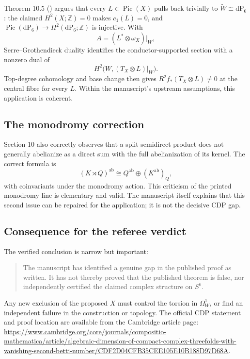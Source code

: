 \documentclass[11pt]{article}
\newcommand{\fileline}[1]{\path{#1}}
\newcommand{\Z}{\mathbb Z}
\newcommand{\Pic}{\operatorname{Pic}}
\begin{document}
Theorem 10.5 (\fileline{parts/packet_08_body.tex:459}) argues that every $L\in\Pic(X)$ pulls back trivially to $\widetilde W\cong\mathrm{dP}_6$: the claimed $H^2(X;\Z)=0$ makes $c_1(L)=0$, and $\Pic(\mathrm{dP}_6)\to H^2(\mathrm{dP}_6;\Z)$ is injective. With
\[
A=(L^*\otimes\omega_X)|_W,
\]
Serre--Grothendieck duality identifies the conductor-supported section with a nonzero dual of
\[
H^2\bigl(W,(T_X\otimes L)|_W\bigr).
\]
Top-degree cohomology and base change then gives $R^2f_*(T_X\otimes L)\neq0$ at the central fibre for every $L$. Within the manuscript's upstream assumptions, this application is coherent.

\subsection{The monodromy correction}

Section 10 also correctly observes that a split semidirect product does not generally abelianize as a direct sum with the full abelianization of its kernel. The correct formula is
\[
(K\rtimes Q)^{\mathrm{ab}}\cong Q^{\mathrm{ab}}\oplus(K^{\mathrm{ab}})_Q,
\]
with coinvariants under the monodromy action. This criticism of the printed monodromy line is elementary and valid. The manuscript itself explains that this second issue can be repaired for the application; it is not the decisive CDP gap.

\subsection{Consequence for the referee verdict}

The verified conclusion is narrow but important:

\begin{quote}
The manuscript has identified a genuine gap in the published proof as written. It has not thereby proved that the published theorem is false, nor independently certified the claimed complex structure on $S^6$.
\end{quote}

Any new exclusion of the proposed $X$ must control the torsion in $\Omega_W^1$, or find an independent failure in the construction or topology. The official CDP statement and proof location are available from the Cambridge article page:
\url{https://www.cambridge.org/core/journals/compositio-mathematica/article/algebraic-dimension-of-compact-complex-threefolds-with-vanishing-second-betti-number/CDF2D04CFB35CEE105E10B188D97D68A}.
\end{document}
